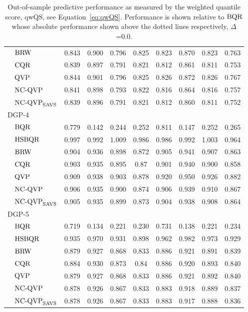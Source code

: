 \begin{table}[H]
{\begin{tabular}{ll|cccc|cccc}
 & $\operatorname{BRW}$ & 0.843 & 0.900 & 0.796 & 0.825 & 0.823 & 0.870 & 0.823 & 0.763 \\
 & $\operatorname{CQR}$ & 0.839 & 0.897 & 0.791 & 0.821 & 0.812 & 0.861 & 0.811 & 0.753 \\
 & $\operatorname{QVP}$ & 0.844 & 0.901 & 0.796 & 0.825 & 0.826 & 0.872 & 0.826 & 0.767 \\
 & $\operatorname{NC-QVP}$ & 0.841 & 0.898 & 0.793 & 0.822 & 0.816 & 0.864 & 0.816 & 0.757 \\
 & $\operatorname{NC-QVP}_{\mathrm{SAVS}}$ & 0.839 & 0.896 & 0.791 & 0.821 & 0.812 & 0.860 & 0.811 & 0.752 \\ \hline
\multicolumn{2}{l|}{$\mathrm{DGP}$-4} &  &  &  &  &  &  \\
 & $\operatorname{BQR}$ & 0.779 & 0.142 & 0.244 & 0.252 & 0.811 & 0.147 & 0.252 & 0.265 \\ \hdashline
 & $\operatorname{HSBQR}$ & 0.997 & 0.992 & 1.009 & 0.986 & 0.986 & 0.992 & 1.003 & 0.964 \\
 & $\operatorname{BRW}$ & 0.904 & 0.936 & 0.898 & 0.872 & 0.905 & 0.941 & 0.907 & 0.863 \\
 & $\operatorname{CQR}$ & 0.903 & 0.935 & 0.895 & 0.87 & 0.901 & 0.940 & 0.900 & 0.858 \\
 & $\operatorname{QVP}$ & 0.909 & 0.938 & 0.903 & 0.878 & 0.920 & 0.950 & 0.926 & 0.882 \\
 & $\operatorname{NC-QVP}$ & 0.906 & 0.935 & 0.900 & 0.874 & 0.906 & 0.939 & 0.910 & 0.867 \\
 & $\operatorname{NC-QVP}_{\mathrm{SAVS}}$ & 0.905 & 0.935 & 0.899 & 0.873 & 0.904 & 0.938 & 0.908 & 0.864 \\ \hline
\multicolumn{2}{l|}{$\mathrm{DGP}$-5} &  &  &  &  &  &  \\
 & $\operatorname{BQR}$ & 0.719 & 0.134 & 0.221 & 0.230 & 0.731 & 0.138 & 0.221 & 0.234 \\ \hdashline
 & $\operatorname{HSBQR}$ & 0.935 & 0.970 & 0.931 & 0.898 & 0.962 & 0.982 & 0.973 & 0.929 \\
 & $\operatorname{BRW}$ & 0.879 & 0.927 & 0.868 & 0.833 & 0.886 & 0.921 & 0.891 & 0.839 \\
 & $\operatorname{CQR}$ & 0.884 & 0.930 & 0.873 & 0.84 & 0.886 & 0.920 & 0.893 & 0.840 \\
 & $\operatorname{QVP}$ & 0.879 & 0.927 & 0.868 & 0.833 & 0.886 & 0.921 & 0.892 & 0.840 \\
 & $\operatorname{NC-QVP}$ & 0.878 & 0.926 & 0.867 & 0.833 & 0.883 & 0.918 & 0.889 & 0.837 \\
 & $\operatorname{NC-QVP}_{\mathrm{SAVS}}$ & 0.878 & 0.926 & 0.867 & 0.833 & 0.883 & 0.917 & 0.888 & 0.836 \\ \hline
\end{tabular}%
}
\caption{Out-of-sample predictive performance as measured by the weighted quantile score, $\mathrm{qwQS}$, see Equation~\ref{eq:qwQS}. Performance is shown relative to $\operatorname{BQR}$ whose absolute performance shown above the dotted lines respectively, $\varDelta$=0.0.}
\label{tab:prediction-increasing-T}
\end{table}

